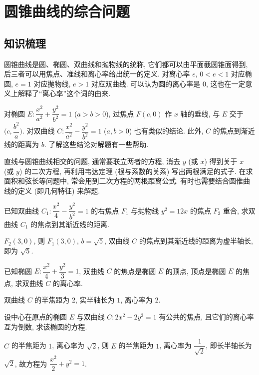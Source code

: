 
\section{圆锥曲线的综合问题}

\subsection{知识梳理}
圆锥曲线是圆、椭圆、双曲线和抛物线的统称, 它们都可以由平面截圆锥面得到, 后三者可以用焦点、准线和离心率给出统一的定义. 对离心率 $e$, $0<e<1$ 对应椭圆, $e=1$ 对应抛物线, $e>1$ 对应双曲线. 可以认为圆的离心率是 $0$, 这也在一定意义上解释了“离心率”这个词的由来.

对椭圆 $E\colon \dfrac{x^2}{a^2}+\dfrac{y^2}{b^2}=1$ ($a>b>0$), 过焦点 $F(c,0)$ 作 $x$ 轴的垂线, 与 $E$ 交于 $\Big(c,\dfrac{b^2}a\Big)$. 对双曲线 $C\colon \dfrac{x^2}{a^2}-\dfrac{y^2}{b^2}=1$ ($a,b>0$) 也有类似的结论. 此外, $C$ 的焦点到渐近线的距离为 $b$. 了解这些结论对解题有一些帮助.

直线与圆锥曲线相交的问题, 通常要联立两者的方程, 消去 $y$ (或 $x$) 得到关于 $x$ (或 $y$) 的二次方程, 再利用韦达定理 (根与系数的关系) 写出两根满足的式子. 在求面积和弦长等问题中, 常会用到二次方程的两根距离公式. 有时也需要结合圆倠曲线的定义 (即几何特征) 来解题.

\lianxi
\begin{exercise}
    已知双曲线 $C_1\colon \dfrac{x^2}{4}-\dfrac{y^2}{b^2}=1$ 的右焦点 $F_1$ 与抛物线 $y^2 =12x$ 的焦点 $F_2$ 重合, 求双曲线 $C_1$ 的焦点到其渐近线的距离.
\end{exercise}
\beginsolution
    $F_2(3,0)$, 则 $F_1(3,0)$, $b=\sqrt5$, 双曲线 $C$ 的焦点到其渐近线的距离为虚半轴长, 即为 $\sqrt5$.
\endsolution

\begin{exercise}
    已知椭圆 $E\colon \dfrac{x^2}{4}+\dfrac{y^2}3=1$, 双曲线 $C$ 的焦点是椭圆 $E$ 的顶点, 顶点是椭圆 $E$ 的焦点, 求双曲线 $C$ 的离心率.
\end{exercise}
\beginsolution
    双曲线 $C$ 的半焦距为 $2$, 实半轴长为 $1$, 离心率为 $2$.
\endsolution

\begin{exercise}
    设中心在原点的椭圆 $E$ 与双曲线 $C\colon 2x^2 -2y^2 =1$ 有公共的焦点, 且它们的离心率互为倒数, 求该椭圆的方程.
\end{exercise}
\beginsolution
    $C$ 的半焦距为 $1$, 离心率为 $\sqrt2$, 则 $E$ 的半焦距为 $1$, 离心率为 $\dfrac1{\sqrt2}$, 即长半轴长为 $\sqrt2$, 故方程为 $\dfrac{x^2}2+ y^2= 1$.
\endsolution

